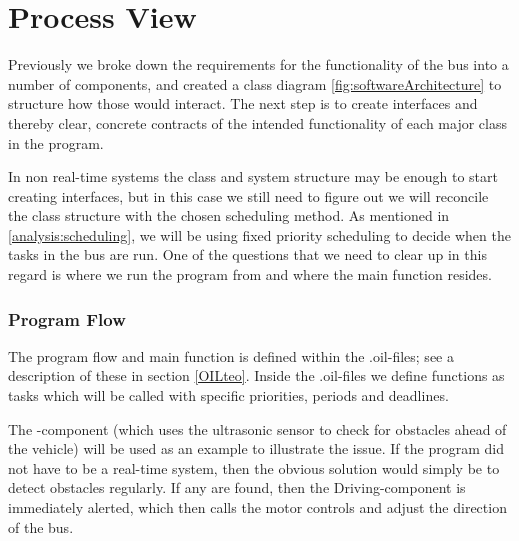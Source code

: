 \section{Process View} \label{design:processView}


Previously we broke down the requirements for the functionality of the bus into a number of components, and created a class diagram \ref{fig:softwareArchitecture} to structure how those would interact. The next step is to create interfaces and thereby clear, concrete contracts of the intended functionality of each major class in the program. 

In non real-time systems the class and system structure may be enough to start creating interfaces, but in this case we still need to figure out we will reconcile the class structure with the chosen scheduling method. As mentioned in \ref{analysis:scheduling}, we will be using fixed priority scheduling to decide when the tasks in the bus are run. One of the questions that we need to clear up in this regard is where we run the program from and where the main function resides. %

\subsubsection{Program Flow}
The program flow and main function is defined within the .oil-files; see a description of these in section \ref{OILteo}. Inside the .oil-files we define functions as tasks which will be called with specific priorities, periods and deadlines. 

The -component (which uses the ultrasonic sensor to check for obstacles ahead of the vehicle) will be used as an example to illustrate the issue. If the program did not have to be a real-time system, then the obvious solution would simply be to detect obstacles regularly. If any are found, then the Driving-component is immediately alerted, which then calls the motor controls and adjust the direction of the bus.


